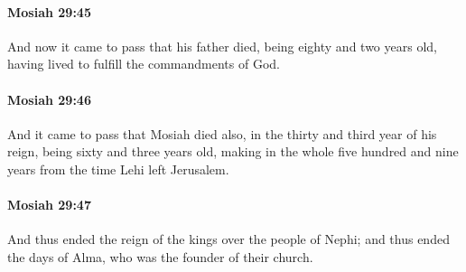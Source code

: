 		\paragraph{Mosiah 29:45} %
			\label{MOSIAH-29-45}

			And now it came to pass that his father died,
			being eighty and two years old,
			having lived to fulfill the commandments of God.

		\paragraph{Mosiah 29:46} %
			\label{MOSIAH-29-46}

			And it came to pass that
			Mosiah died also, in the thirty and third year of his reign,
			being sixty and three years old,
			making in the whole five hundred and nine years
			from the time Lehi left Jerusalem.

		\paragraph{Mosiah 29:47} %
			\label{MOSIAH-29-47}

			And thus ended the reign of the kings over the people of Nephi;
			and thus ended the days of Alma,
			who was the founder of their church.